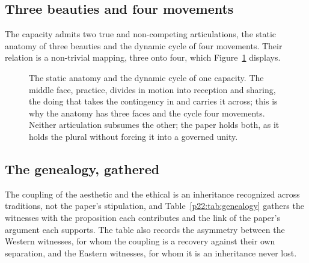 \subsection{Three beauties and four movements}
\label{p22:sub:contrib-map}

The capacity admits two true and non-competing articulations, the static anatomy of three beauties and the dynamic cycle of four movements. Their relation is a non-trivial mapping, three onto four, which Figure~\ref{p22:fig:map} displays.

\begin{figure}[ht]
\centering
{}
\caption{The static anatomy and the dynamic cycle of one capacity. The middle face, practice, divides in motion into reception and sharing, the doing that takes the contingency in and carries it across; this is why the anatomy has three faces and the cycle four movements. Neither articulation subsumes the other; the paper holds both, as it holds the plural without forcing it into a governed unity.}
\label{p22:fig:map}
\end{figure}

\subsection{The genealogy, gathered}
\label{p22:sub:contrib-genealogy}

The coupling of the aesthetic and the ethical is an inheritance recognized across traditions, not the paper's stipulation, and Table~\ref{p22:tab:genealogy} gathers the witnesses with the proposition each contributes and the link of the paper's argument each supports. The table also records the asymmetry between the Western witnesses, for whom the coupling is a recovery against their own separation, and the Eastern witnesses, for whom it is an inheritance never lost.

